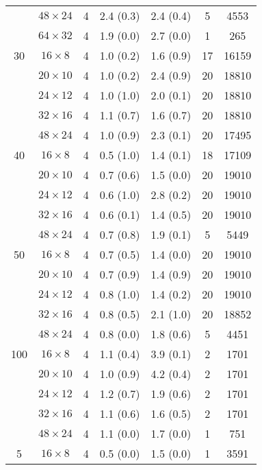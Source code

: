 \begin{longtable}{ccccccc}
    & $48 \times  24$ &  4 & 2.4 \; (0.3) & 2.4 \; (0.4) & 5 & 4553 \\
    & $64 \times  32$ &  4 & 1.9 \; (0.0) & 2.7 \; (0.0) & 1 & 265 \\
\midrule
 30 & $16 \times   8$ &  4 & 1.0 \; (0.2) & 1.6 \; (0.9) & 17 & 16159 \\
    & $20 \times  10$ &  4 & 1.0 \; (0.2) & 2.4 \; (0.9) & 20 & 18810 \\
    & $24 \times  12$ &  4 & 1.0 \; (1.0) & 2.0 \; (0.1) & 20 & 18810 \\
    & $32 \times  16$ &  4 & 1.1 \; (0.7) & 1.6 \; (0.7) & 20 & 18810 \\
    & $48 \times  24$ &  4 & 1.0 \; (0.9) & 2.3 \; (0.1) & 20 & 17495 \\
\midrule
 40 & $16 \times   8$ &  4 & 0.5 \; (1.0) & 1.4 \; (0.1) & 18 & 17109 \\
    & $20 \times  10$ &  4 & 0.7 \; (0.6) & 1.5 \; (0.0) & 20 & 19010 \\
    & $24 \times  12$ &  4 & 0.6 \; (1.0) & 2.8 \; (0.2) & 20 & 19010 \\
    & $32 \times  16$ &  4 & 0.6 \; (0.1) & 1.4 \; (0.5) & 20 & 19010 \\
    & $48 \times  24$ &  4 & 0.7 \; (0.8) & 1.9 \; (0.1) & 5 & 5449 \\
\midrule
 50 & $16 \times   8$ &  4 & 0.7 \; (0.5) & 1.4 \; (0.0) & 20 & 19010 \\
    & $20 \times  10$ &  4 & 0.7 \; (0.9) & 1.4 \; (0.9) & 20 & 19010 \\
    & $24 \times  12$ &  4 & 0.8 \; (1.0) & 1.4 \; (0.2) & 20 & 19010 \\
    & $32 \times  16$ &  4 & 0.8 \; (0.5) & 2.1 \; (1.0) & 20 & 18852 \\
    & $48 \times  24$ &  4 & 0.8 \; (0.0) & 1.8 \; (0.6) & 5 & 4451 \\
\midrule
100 & $16 \times   8$ &  4 & 1.1 \; (0.4) & 3.9 \; (0.1) & 2 & 1701 \\
    & $20 \times  10$ &  4 & 1.0 \; (0.9) & 4.2 \; (0.4) & 2 & 1701 \\
    & $24 \times  12$ &  4 & 1.2 \; (0.7) & 1.9 \; (0.6) & 2 & 1701 \\
    & $32 \times  16$ &  4 & 1.1 \; (0.6) & 1.6 \; (0.5) & 2 & 1701 \\
    & $48 \times  24$ &  4 & 1.1 \; (0.0) & 1.7 \; (0.0) & 1 & 751 \\
\midrule
  5 & $16 \times   8$ &  4 & 0.5 \; (0.0) & 1.5 \; (0.0) & 1 & 3591 \\

\end{longtable}
